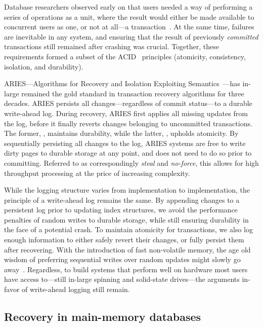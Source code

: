 Database researchers observed early on that users needed a way of performing a
series of operations as a unit, where the result would either be made available
to concurrent users as one, or not at all---a transaction~\cite{bernstein}. At
the same time, failures are inevitable in any system, and ensuring that the
result of previously \textit{committed} transactions still remained after
crashing was crucial. Together, these requirements formed a subset of the
ACID~\cite{acid} principles (atomicity, consistency, isolation, and durability).

ARIES---Algorithms for Recovery and Isolation Exploiting
Semantics~\cite{aries}---has in-large remained the gold standard in transaction
recovery algorithms for three decades. ARIES persists all changes---regardless
of commit status---to a durable write-ahead log. During recovery, ARIES first
applies all missing updates from the log, before it finally reverts changes
belonging to uncommitted transactions. The former, , maintains
durability, while the latter, , upholds atomicity. By sequentially
persisting all changes to the log, ARIES systems are free to write dirty pages
to durable storage at any point, and does not need to do so prior to committing.
Referred to as correspondingly \textit{steal} and \textit{no-force}, this allows
for high throughput processing at the price of increasing complexity.

While the logging structure varies from implementation to implementation, the
principle of a write-ahead log remains the same. By appending changes to a
persistent log prior to updating index structures, we avoid the performance
penalties of random writes to durable storage, while still ensuring durability
in the face of a potential crash. To maintain atomicity for transactions, we
also log enough information to either safely revert their changes, or fully
persist them after recovering. With the introduction of fast non-volatile
memory, the age old wisdom of preferring sequential writes over random updates
might slowly go away~\cite{mars, wbl}. Regardless, to build systems that perform
well on hardware most users have access to---still in-large spinning and
solid-state drives---the arguments in-favor of write-ahead logging still remain.

\subsection{Recovery in main-memory databases}\label{sec:mm-recovery}

